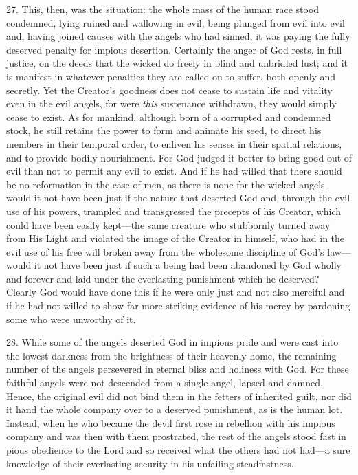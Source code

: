 27. This, then, was the situation: the whole mass of the human race stood condemned, lying ruined and wallowing in evil, being plunged from evil into evil and, having joined causes with the angels who had sinned, it was paying the fully deserved penalty for impious desertion. Certainly the anger of God rests, in full justice, on the deeds that the wicked do freely in blind and unbridled lust; and it is manifest in whatever penalties they are called on to suffer, both openly and secretly. Yet the Creator's goodness does not cease to sustain life and vitality even in the evil angels, for were \emph{this} sustenance withdrawn, they would simply cease to exist. As for mankind, although born of a corrupted and condemned stock, he still retains the power to form and animate his seed, to direct his members in their temporal order, to enliven his senses in their spatial relations, and to provide bodily nourishment. For God judged it better to bring good out of evil than not to permit any evil to exist. And if he had willed that there should be no reformation in the case of men, as there is none for the wicked angels, would it not have been just if the nature that deserted God and, through the evil use of his powers, trampled and transgressed the precepts of his Creator, which could have been easily kept—the same creature who stubbornly turned away from His Light and violated the image of the Creator in himself, who had in the evil use of his free will broken away from the wholesome discipline of God's law—would it not have been just if such a being had been abandoned by God wholly and forever and laid under the everlasting punishment which he deserved? Clearly God would have done this if he were only just and not also merciful and if he had not willed to show far more striking evidence of his mercy by pardoning some who were unworthy of it.


28. While some of the angels deserted God in impious pride and were cast into the lowest darkness from the brightness of their heavenly home, the remaining number of the angels persevered in eternal bliss and holiness with God. For these faithful angels were not descended from a single angel, lapsed and damned. Hence, the original evil did not bind them in the fetters of inherited guilt, nor did it hand the whole company over to a deserved punishment, as is the human lot. Instead, when he who became the devil first rose in rebellion with his impious company and was then with them prostrated, the rest of the angels stood fast in pious obedience to the Lord and so received what the others had not had—a sure knowledge of their everlasting security in his unfailing steadfastness.

